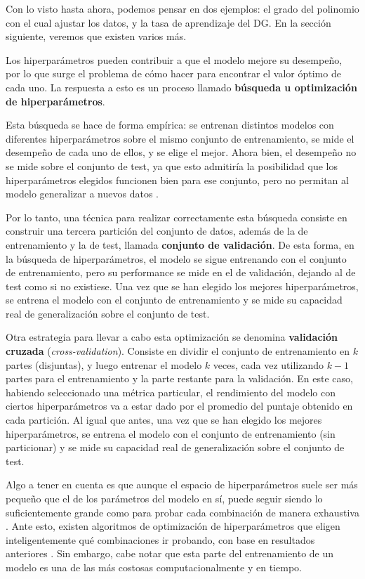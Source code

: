 \documentclass[../../main.tex]{subfiles}
\begin{document}
Con lo visto hasta ahora, podemos pensar en dos ejemplos: el grado del polinomio con el
cual ajustar los datos, y la tasa de aprendizaje del DG. En la sección siguiente, veremos
que existen varios más.

Los hiperparámetros pueden contribuir a que el modelo mejore su desempeño, por lo que
surge el problema de cómo hacer para encontrar el valor óptimo de cada uno. La respuesta a
esto es un proceso llamado \textbf{búsqueda u optimización de hiperparámetros}.

Esta búsqueda se hace de forma empírica: se entrenan distintos modelos con diferentes
hiperparámetros sobre el mismo conjunto de entrenamiento, se mide el desempeño de cada
uno de ellos, y se elige el mejor. Ahora bien, el desempeño no se mide sobre el
conjunto de test, ya que esto admitiría la posibilidad que los hiperparámetros elegidos
funcionen bien para ese conjunto, pero no permitan al modelo generalizar a nuevos
datos \cite{prince2024understanding}.

Por lo tanto, una técnica para realizar correctamente esta búsqueda consiste en construir
una tercera partición del conjunto de datos, además de la de entrenamiento y la de test,
llamada \textbf{conjunto de validación}. De esta forma, en la búsqueda de hiperparámetros,
el modelo se sigue entrenando con el conjunto de entrenamiento, pero su performance se
mide en el de validación, dejando al de test como si no existiese. Una vez que se han
elegido los mejores hiperparámetros, se entrena el modelo con el conjunto de entrenamiento
y se mide su capacidad real de generalización sobre el conjunto de test.

Otra estrategia para llevar a cabo esta optimización se denomina \textbf{validación
cruzada} (\textit{cross-validation}). Consiste en dividir el conjunto de entrenamiento en
\(k\) partes (disjuntas), y luego entrenar el modelo \(k\) veces, cada vez utilizando
\(k-1\) partes para el entrenamiento y la parte restante para la validación. En este caso,
habiendo seleccionado una métrica particular, el rendimiento del modelo con ciertos
hiperparámetros va a estar dado por el promedio del puntaje obtenido en cada partición. Al
igual que antes, una vez que se han elegido los mejores hiperparámetros, se entrena el
modelo con el conjunto de entrenamiento (sin particionar) y se mide su capacidad real de
generalización sobre el conjunto de test.

Algo a tener en cuenta es que aunque el espacio de hiperparámetros suele ser más pequeño
que el de los parámetros del modelo en sí, puede seguir siendo lo suficientemente grande
como para probar cada combinación de manera exhaustiva \cite{prince2024understanding}.
Ante esto, existen algoritmos de optimización de hiperparámetros que eligen
inteligentemente qué combinaciones ir probando, con base en resultados anteriores
\cite{prince2024understanding}. Sin embargo, cabe notar que esta parte del entrenamiento
de un modelo es una de las más costosas computacionalmente y en tiempo.
\end{document}
